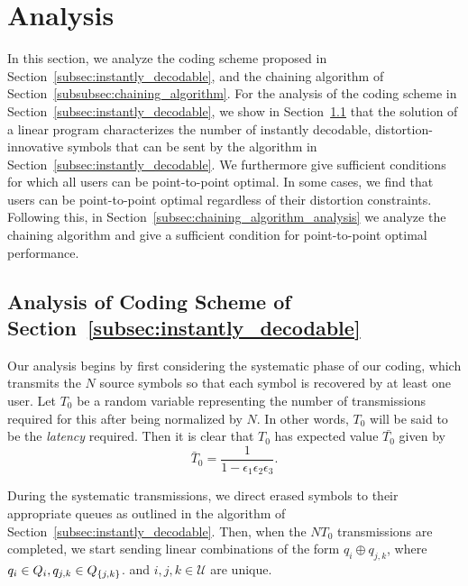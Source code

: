 \section{Analysis}
\label{sec:analysis}

In this section, we analyze the coding scheme proposed in Section~\ref{subsec:instantly_decodable}, and the chaining algorithm of Section~\ref{subsubsec:chaining_algorithm}.
For the analysis of the coding scheme in Section~\ref{subsec:instantly_decodable}, we show in Section~\ref{subsec:analysis_instantly_decodable} that the solution of a linear program characterizes the number of instantly decodable, distortion-innovative symbols that can be sent by the algorithm in Section~\ref{subsec:instantly_decodable}.
We furthermore give sufficient conditions for which all users can be point-to-point optimal.  In some cases, we find that users can be point-to-point optimal regardless of their distortion constraints.  Following this, in Section~\ref{subsec:chaining_algorithm_analysis} we analyze the chaining algorithm and give a sufficient condition for point-to-point optimal performance.

\subsection{Analysis of Coding Scheme of Section~\ref{subsec:instantly_decodable}}
\label{subsec:analysis_instantly_decodable}

Our analysis begins by first considering the systematic phase of our coding, which transmits the $N$ source symbols so that each symbol is recovered by at least one user.  Let $T_0$ be a random variable representing the number of transmissions required for this after being normalized by $N$.  In other words, $T_0$ will be said to be the \emph{latency} required.  Then it is clear that $T_0$ has expected value $\bar{T_0}$ given by
%
\begin{equation}
\label{eq:T0}
	\bar{T}_{0} = \frac{1}{1 - \epsilon_1\epsilon_2\epsilon_3}.
\end{equation}

During the systematic transmissions, we direct erased symbols to their appropriate queues as outlined in the algorithm of Section~\ref{subsec:instantly_decodable}.  Then, when the $NT_0$ transmissions are completed, we start sending linear combinations of the form $q_i \oplus q_{j,k}$, where $q_i \in Q_i, q_{j,k} \in Q_{\{j,k\}}$.
and $i,j,k\in \mathcal{U}$  are unique.

